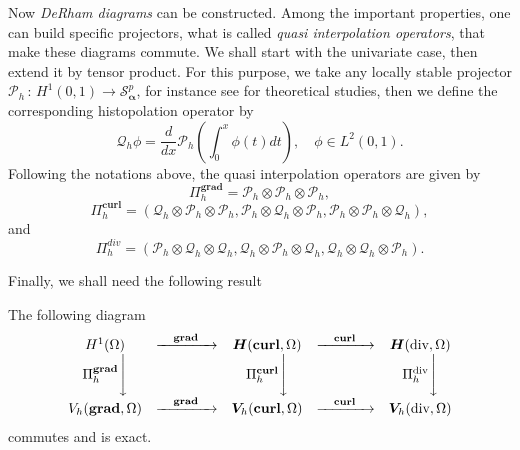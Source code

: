 Now {\em DeRham diagrams} can be constructed. Among the important properties, one can build specific projectors, what is called {\em quasi interpolation operators}, that make these diagrams commute. We shall start with the univariate case, then extend it by tensor product. For this purpose, we take any locally stable projector $\mathcal{P}_h \,:\, H^1(0,1) \longrightarrow \mathcal{S}^p_{\bm{\alpha}}$, for instance see \cite{schumaker2007spline} for theoretical studies, then we define the corresponding 
histopolation operator by 
\begin{equation*}
\mathcal{Q}_h \phi = \frac{d}{d x} \mathcal{P}_h \left( \int_0^x \phi(t) dt \right), \quad \phi \in L^2(0,1). 
\end{equation*} 
Following the notations above, the quasi interpolation operators are given by  
\begin{equation*}
\Pi^{\textbf{grad}}_h=\mathcal{P}_h \otimes \mathcal{P}_h \otimes \mathcal{P}_h,
\end{equation*}
\begin{equation*}
\Pi^{\textbf{curl}}_h=\left(\mathcal{Q}_h \otimes \mathcal{P}_h \otimes \mathcal{P}_h,\mathcal{P}_h \otimes \mathcal{Q}_h \otimes \mathcal{P}_h,\mathcal{P}_h \otimes \mathcal{P}_h \otimes \mathcal{Q}_h\right),
\end{equation*}
and
\begin{equation*}
\Pi^{div}_h=\left(\mathcal{P}_h \otimes \mathcal{Q}_h \otimes \mathcal{Q}_h,\mathcal{Q}_h \otimes \mathcal{P}_h \otimes \mathcal{Q}_h,\mathcal{Q}_h \otimes \mathcal{Q}_h \otimes \mathcal{P}_h\right).
\end{equation*}

Finally, we shall need the following result
\begin{proposition}{\cite[Proposition 4.5]{buffa2011isogeometric}}
The following diagram
\begin{align}\label{pr-eq:DeRham-diagram}
    \begin{array}{ccccc}
   H^1(\Omega) & \xrightarrow{\quad \textbf{grad} \quad } & \bm{H}(\textbf{curl},\Omega) & \xrightarrow{\quad \textbf{curl} \quad } & \bm{H}(\text{div},\Omega)\\
  \Pi_h^{\textbf{grad}} \Bigg\downarrow &  & \Pi_h^{\textbf{curl}} \Bigg\downarrow &  & \Pi_h^{\text{div}} \Bigg\downarrow \\
  V_h(\textbf{grad},\Omega) & \xrightarrow{\quad \textbf{grad} \quad } & \bm{V}_h(\textbf{curl},\Omega) & \xrightarrow{\quad \textbf{curl} \quad } & \bm{V}_h(\text{div},\Omega)
  \end{array}
\end{align}
commutes and is exact.
\end{proposition}




